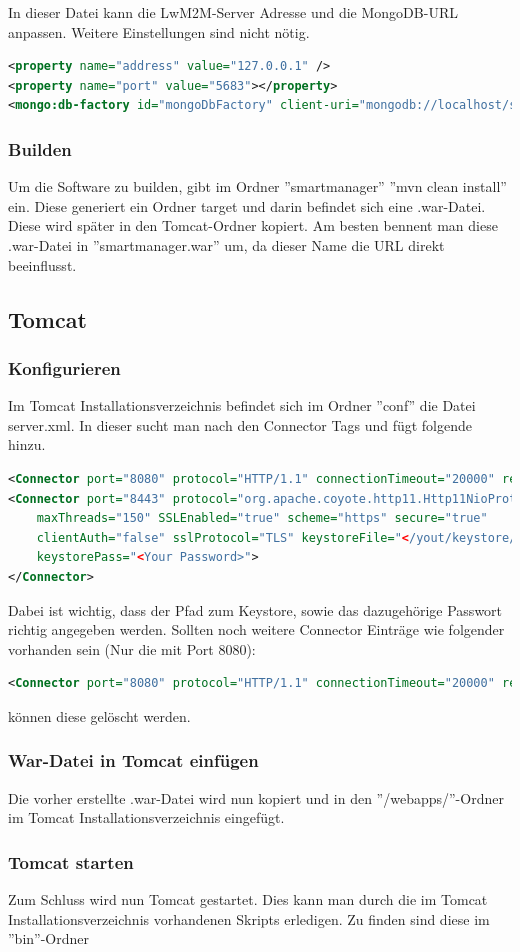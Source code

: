 In dieser Datei kann die LwM2M-Server Adresse und die MongoDB-URL anpassen. Weitere Einstellungen sind nicht nötig.
\begin{lstlisting}[language=xml]
<property name="address" value="127.0.0.1" />
<property name="port" value="5683"></property>
<mongo:db-factory id="mongoDbFactory" client-uri="mongodb://localhost/smartmanager" />
\end{lstlisting}

\subsubsection{Builden}
Um die Software zu builden, gibt im Ordner ''smartmanager'' ''mvn clean install'' ein. Diese generiert ein Ordner target und darin befindet sich eine .war-Datei. Diese wird später in den Tomcat-Ordner kopiert. Am besten bennent man diese .war-Datei in ''smartmanager.war'' um, da dieser Name die URL direkt beeinflusst.

\subsection{Tomcat}
\subsubsection{Konfigurieren}
Im Tomcat Installationsverzeichnis befindet sich im Ordner ''conf'' die Datei server.xml. In dieser sucht man nach den Connector Tags und fügt folgende hinzu.
\begin{lstlisting}[language=xml]
<Connector port="8080" protocol="HTTP/1.1" connectionTimeout="20000" redirectPort="8443" />
<Connector port="8443" protocol="org.apache.coyote.http11.Http11NioProtocol"
	maxThreads="150" SSLEnabled="true" scheme="https" secure="true"
	clientAuth="false" sslProtocol="TLS" keystoreFile="</yout/keystore/path/.keystore>"
	keystorePass="<Your Password>">
</Connector>
\end{lstlisting}

Dabei ist wichtig, dass der Pfad zum Keystore, sowie das dazugehörige Passwort richtig angegeben werden.
Sollten noch weitere Connector Einträge wie folgender vorhanden sein (Nur die mit Port 8080):
\begin{lstlisting}[language=xml]
<Connector port="8080" protocol="HTTP/1.1" connectionTimeout="20000" redirectPort="8443" />
\end{lstlisting}
können diese gelöscht werden.
\subsubsection{War-Datei in Tomcat einfügen}
Die vorher erstellte .war-Datei wird nun kopiert und in den ''/webapps/''-Ordner im Tomcat Installationsverzeichnis eingefügt.
\subsubsection{Tomcat starten}
Zum Schluss wird nun Tomcat gestartet. Dies kann man durch die im Tomcat Installationsverzeichnis vorhandenen Skripts erledigen. Zu finden sind diese im ''bin''-Ordner
